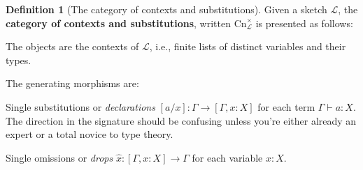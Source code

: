 \documentclass[12pt,twoside]{reedthesis}
\theoremstyle{definition}
\newtheorem{definition}{Definition}
\theoremstyle{remark}
\theoremstyle{plain}
\begin{document}
\begin{definition}[The category of contexts and substitutions]\label{def:syn cat}
  Given a sketch $\mathcal{L}$, the \textbf{category of contexts and substitutions}, written \( \text{Cn}^{\times}_{\mathcal{L}}\) is presented as follows:
  \begin{outline}
    \1 The objects are the contexts of \( \mathcal{L} \), i.e., finite lists of
    distinct variables and their types.

    \1 The generating morphisms are:

    \2 Single substitutions or \emph{declarations} \( [a/x] : \Gamma \rightarrow [\Gamma, x:X] \)
    for each term \( \Gamma \vdash a : X \). The direction in the signature should be
    confusing unless you're either already an expert or a total novice to type
    theory.

    \2 Single omissions or \emph{drops} \( \hat{x} : [\Gamma, x : X] \rightarrow \Gamma \) for each
    variable $x:X$.


\end{outline}
\end{definition}
\end{document}
